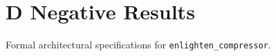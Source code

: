 \section{D Negative Results}

Formal architectural specifications for \texttt{enlighten_compressor}.

